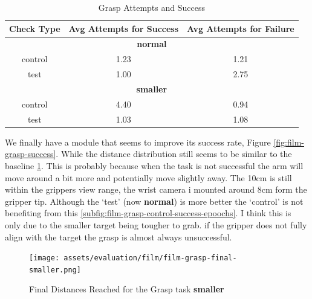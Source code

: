 \begin{table}[ht]
\centering
  \begin{tabular}{||c c c||}
  \hline
  Check Type & Avg Attempts for Success & Avg Attempts for Failure\\
  \hline
  \hline
  \multicolumn{3}{||c||}{\textbf{normal}} \\
  control & 1.23 & 1.21 \\
  test    & 1.00 & 2.75 \\
  \hline
  \multicolumn{3}{||c||}{\textbf{smaller}} \\
  control & 4.40 & 0.94 \\
  test    & 1.03 & 1.08 \\
  \hline
  \end{tabular}\caption{Grasp Attempts and Success}\label{tab:film-grasp-attempts}
\end{table}

We finally have a module that seems to improve its success rate, Figure \ref{fig:film-grasp-success}. While the distance distribution still seems to be similar to the baseline \ref{fig:film-grasp-final-smaller}. This is probably because when the task is not successful the arm will move around a bit more and potentially move slightly away. The 10cm is still within the grippers view range, the wrist camera i mounted around 8cm form the gripper tip. Although the `test' (now \textbf{normal}) is more better the `control' is not benefiting from this \ref{subfig:film-grasp-control-success-epoochs}. I think this is only  due to the smaller target being tougher to grab. if the gripper does not fully align with the target the grasp is almost always unsuccessful. 


\begin{figure}[H]
  \centering
  \texttt{[image: assets/evaluation/film/film-grasp-final-smaller.png]}
  \caption{Final Distances Reached for the Grasp task \textbf{smaller}}\label{fig:film-grasp-final-smaller}
\end{figure}

